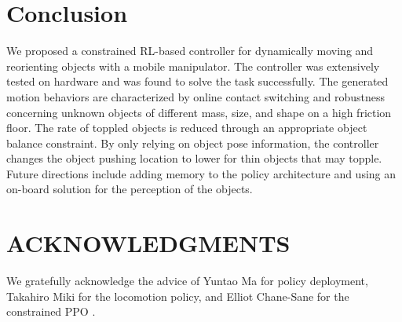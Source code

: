 \section{Conclusion}
We proposed a constrained RL-based controller for dynamically moving and reorienting objects with a mobile manipulator. The controller was extensively tested on hardware and was found to solve the task successfully. The generated motion behaviors are characterized by online contact switching and robustness concerning unknown objects of different mass, size, and shape on a high friction floor. The rate of toppled objects is reduced through an appropriate object balance constraint. By only relying on object pose information, the controller changes the object pushing location to lower for thin objects that may topple. Future directions include adding memory to the policy architecture and using an on-board solution for the perception of the objects.
%
\section*{ACKNOWLEDGMENTS}
We gratefully acknowledge the advice of Yuntao Ma for policy deployment, Takahiro Miki for the locomotion policy, and Elliot Chane-Sane for the constrained PPO \cite{chanesane2024cat}.
